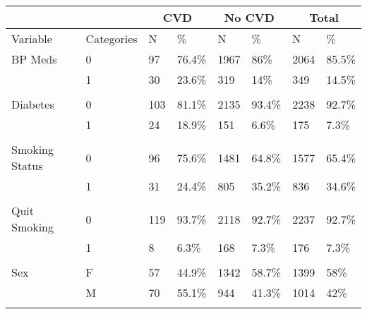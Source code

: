 \documentclass{article}\usepackage[]{graphicx}\usepackage[]{color}
\begin{document}
\begin{table}[ht]
\begin{tabular}{llllllll}
\end{tabular}
\end{table}


\begin{table}[ht]
\centering
\begin{tabular}{llllllll}
& & \multicolumn{2}{c}{CVD}& \multicolumn{2}{c}{No CVD}& \multicolumn{2}{c}{Total}\\
  \hline
Variable & Categories & N & \% & N & \% & N & \% \\ 
   \hline
BP Meds & 0 & 97 & 76.4\% & 1967 & 86\% & 2064 & 85.5\% \\ 
   & 1 & 30 & 23.6\% & 319 & 14\% & 349 & 14.5\% \\ 
   &  &  &  &  &  &  &  \\ 
  Diabetes & 0 & 103 & 81.1\% & 2135 & 93.4\% & 2238 & 92.7\% \\ 
   & 1 & 24 & 18.9\% & 151 & 6.6\% & 175 & 7.3\% \\ 
   &  &  &  &  &  &  &  \\ 
  Smoking Status & 0 & 96 & 75.6\% & 1481 & 64.8\% & 1577 & 65.4\% \\ 
   & 1 & 31 & 24.4\% & 805 & 35.2\% & 836 & 34.6\% \\ 
   &  &  &  &  &  &  &  \\ 
  Quit Smoking & 0 & 119 & 93.7\% & 2118 & 92.7\% & 2237 & 92.7\% \\ 
   & 1 & 8 & 6.3\% & 168 & 7.3\% & 176 & 7.3\% \\ 
   &  &  &  &  &  &  &  \\ 
  Sex & F & 57 & 44.9\% & 1342 & 58.7\% & 1399 & 58\% \\ 
   & M & 70 & 55.1\% & 944 & 41.3\% & 1014 & 42\% \\ 
   &  &  &  &  &  &  &  \\ 
  

\end{tabular}
\end{table}
\end{document}
